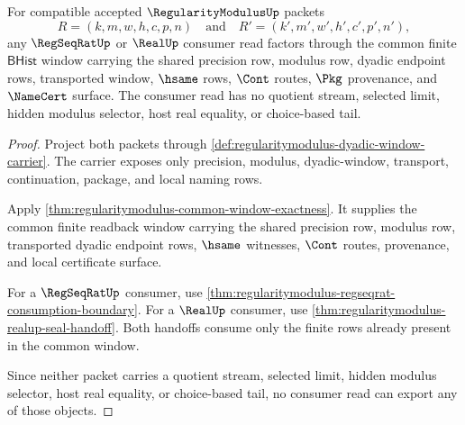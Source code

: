 \begin{theorem}
\label{thm:regularitymodulus-shared-rate-consumer-exhaustion}
For compatible accepted $\RegularityModulusUp$ packets
$$
R=(k,m,w,h,c,p,n)
\quad\text{and}\quad
R'=(k',m',w',h',c',p',n'),
$$
any $\RegSeqRatUp$ or $\RealUp$ consumer read factors through the common
finite $\mathsf{BHist}$ window carrying the shared precision row, modulus row,
dyadic endpoint rows, transported window, $\hsame$ rows, $\Cont$ routes,
$\Pkg$ provenance, and $\NameCert$ surface. The consumer read has no quotient
stream, selected limit, hidden modulus selector, host real equality, or
choice-based tail.
\end{theorem}
\begin{proof}
Project both packets through
\autoref{def:regularitymodulus-dyadic-window-carrier}. The carrier exposes
only precision, modulus, dyadic-window, transport, continuation, package, and
local naming rows.

Apply \autoref{thm:regularitymodulus-common-window-exactness}. It supplies the
common finite readback window carrying the shared precision row, modulus row,
transported dyadic endpoint rows, $\hsame$ witnesses, $\Cont$ routes,
provenance, and local certificate surface.

For a $\RegSeqRatUp$ consumer, use
\autoref{thm:regularitymodulus-regseqrat-consumption-boundary}. For a
$\RealUp$ consumer, use
\autoref{thm:regularitymodulus-realup-seal-handoff}. Both handoffs consume
only the finite rows already present in the common window.

Since neither packet carries a quotient stream, selected limit, hidden modulus
selector, host real equality, or choice-based tail, no consumer read can
export any of those objects.
\end{proof}

